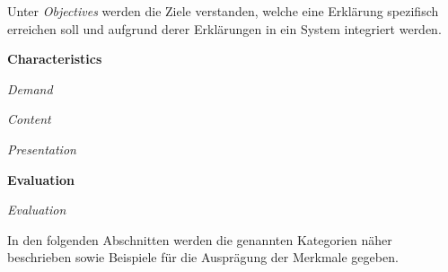 Unter \textit{Objectives} werden die Ziele verstanden, welche eine Erklärung spezifisch erreichen soll und aufgrund derer Erklärungen in ein System integriert werden.

\textbf{Characteristics}

\textit{Demand}

\textit{Content}

\textit{Presentation}

\textbf{Evaluation}

\textit{Evaluation}

\smallbreak

In den folgenden Abschnitten werden die genannten Kategorien näher beschrieben sowie Beispiele für die Ausprägung der Merkmale gegeben.






